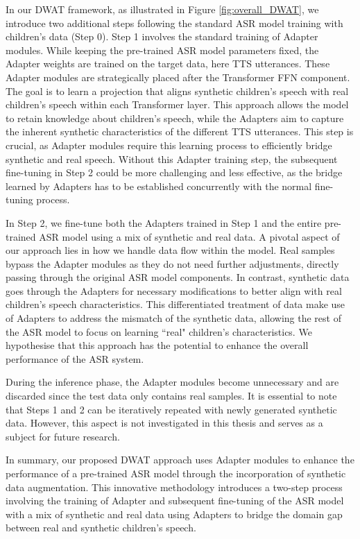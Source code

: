 In our \ac{DWAT}  framework, as illustrated in Figure \ref{fig:overall_DWAT}, we introduce two additional steps following the standard \ac{ASR} model training with children's data (Step 0).
Step 1 involves the standard training of Adapter modules. While keeping the pre-trained \ac{ASR} model parameters fixed, the Adapter weights are trained on the target data, here \ac{TTS} utterances. These Adapter modules are strategically placed after the Transformer \ac{FFN} component. The goal is to learn a projection that aligns synthetic children's speech with real children's speech within each Transformer layer. This approach allows the model to retain knowledge about children's speech, while the Adapters aim to capture the inherent synthetic characteristics of the different \ac{TTS} utterances. This step is crucial, as Adapter modules require this learning process to efficiently bridge synthetic and real speech. Without this Adapter training step, the subsequent fine-tuning in Step 2 could be more challenging and less effective, as the bridge learned by Adapters has to be established concurrently with the normal fine-tuning process.

In Step 2, we fine-tune both the Adapters trained in Step 1 and the entire pre-trained \ac{ASR} model using a mix of synthetic and real data. A pivotal aspect of our approach lies in how we handle data flow within the model. Real samples bypass the Adapter modules as they do not need further adjustments, directly passing through the original \ac{ASR} model components. In contrast, synthetic data goes through the Adapters for necessary modifications to better align with real children's speech characteristics. This differentiated treatment of data make use of Adapters to address the mismatch of the synthetic data, allowing the rest of the \ac{ASR} model to focus on learning ``real" children's characteristics. We hypothesise that this approach has the potential to enhance the overall performance of the \ac{ASR} system.

During the inference phase, the Adapter modules become unnecessary and are discarded since the test data only contains real samples. It is essential to note that Steps 1 and 2 can be iteratively repeated with newly generated synthetic data. However, this aspect is not investigated in this thesis and serves as a subject for future research.

In summary, our proposed \ac{DWAT} approach uses Adapter modules to enhance the performance of a pre-trained \ac{ASR} model through the incorporation of synthetic data augmentation. This innovative methodology introduces a two-step process involving the training of Adapter and subsequent fine-tuning of the \ac{ASR} model with a mix of synthetic and real data using Adapters to bridge the domain gap between real and synthetic children's speech.


